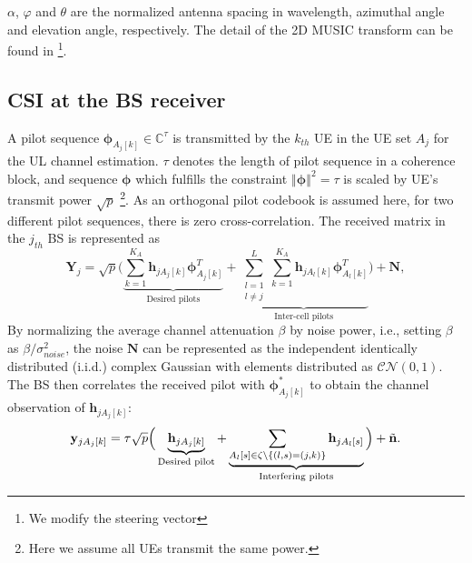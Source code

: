 $\alpha$, $\varphi$ and $\theta$ are the normalized antenna spacing in %
wavelength, azimuthal angle and elevation angle, respectively. The detail of the 2D MUSIC transform can be found in \cite{Chen2018pilot}\footnote{We modify the steering vector}.%

\subsection{CSI at the BS receiver}
A pilot sequence $\mathbf{\phi}_{A_j[k]}\in \mathbb{C}^{\tau} $ is transmitted by the $k_{th}$ UE in the UE set $A_j$ for the UL channel estimation. $\tau$ denotes the length of pilot sequence in a coherence block, and sequence $\mathbf{{\phi}}$ which fulfills the constraint $\left\Vert\mathbf{\phi}\right\Vert^2=\tau$ is scaled by UE's transmit power $\sqrt{p}$ \footnote{Here we assume all UEs transmit the same power. }. As an orthogonal pilot codebook is assumed here, for two different pilot sequences, there is zero cross-correlation.  The received matrix in the $j_{th}$ BS is represented as 
\begin{equation} \label{eq:Yj}
\mathbf{Y}_j = \sqrt{p}\Big(\underbrace{\sum_{k = 1}^{K_A} \mathbf{h}_{jA_j[k]} \mathbf{\phi}_{A_j[k]}^T}_\text{Desired pilots} +\underbrace{\sum_{\substack{l=1 \\ l\neq j}}^{L}\sum_{k = 1}^{K_A} \mathbf{h}_{jA_l[k]} \mathbf{\phi}_{A_l[k]}^T}_\text{Inter-cell pilots}\Big) + \mathbf{N},   
\end{equation}
By normalizing the average channel attenuation $\beta$ by noise power, i.e., setting $\beta$ as $\beta/\sigma^2_{noise}$, the noise $\mathbf{N}$ can be represented as the independent identically distributed
(i.i.d.) complex Gaussian with elements distributed as $\mathcal{CN\left(\mathit{0,1}\right)}$.
The BS then correlates the received pilot with $\mathbf{\phi}_{A_j[k]}^*$ to obtain the channel observation of $\mathbf{h}_{jA_j[k]}$:%
\begin{equation} 
\mathbf{y}_{jA_j[k]} = \tau\sqrt{p}\Big(\underbrace{\mathbf{h}_{jA_j[k]}}_\text{Desired pilot} +\underbrace{\sum_{A_l[s]\in \\ \zeta\char`\\\{(l,s) = (j,k)\}}\mathbf{h}_{jA_l[s]}}_\text{Interfering pilots}\Big) + \tilde{\mathbf{n}}.   \label{eq:pilot contamination}
\end{equation}

